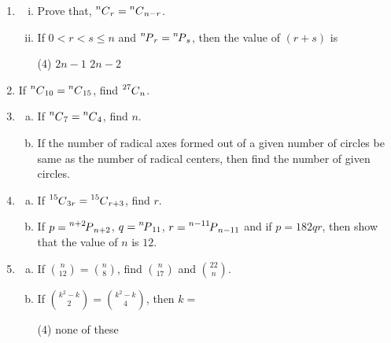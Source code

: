 \documentclass[11pt, a4paper]{article}
\newcommand\myperm[2][^n]{\prescript{#1\mkern-2.5mu}{}P_{#2}}
\newcommand\mycomb[2][^n]{\prescript{#1\mkern-0.5mu}{}C_{#2}}
\begin{document}
\begin{enumerate}

	\item \begin{enumerate}[(i)]
		\item Prove that, $\mycomb[n]{r} =  \mycomb[n]{n-r}$.
		
		\item If $0 < r < s \leq n$ and $\myperm[n]{r} = \myperm[n]{s}$, then the value of $(r+s)$ is
		\begin{tasks}(4)
			\task $2n-1$
			\task $2n-2$
		\end{tasks}
	
	\end{enumerate}
	
	\item If $\mycomb[n]{10} = \mycomb[n]{15}$, find $\mycomb[27]{n}$.
	
	\item \begin{enumerate}[(a)]
		\item If $\mycomb[n]{7} = \mycomb[n]{4}$, find $n$.
		\item If the number of radical axes formed out of a given number of circles be same as the number of radical centers, then find the number of given  circles.
	\end{enumerate}
	
	\item \begin{enumerate}[(a)]
		\item If $\mycomb[15]{3r} = \mycomb[15]{r+3}$, find $r$.
		\item If $p = \myperm[n+2]{n+2}$, $q = \myperm[n]{11}$, $r = \myperm[n-11]{n-11}$ and if $p = 182qr$, then show that the value of $n$ is $12$.	
	\end{enumerate}
	
	\item \begin{enumerate}[(a)]
		\item If $\binom{n}{12} = \binom{n}{8}$, find $\binom{n}{17}$ and $\binom{22}{n}$.
		
		\item If $\binom{k^2-k}{2} = \binom{k^2-k}{4}$, then $k = $
		\begin{tasks}(4)
			\task 2
			\task 3
			\task 4
			\task none of these
		\end{tasks}
	
	\end{enumerate}


\end{enumerate}
\end{document}
